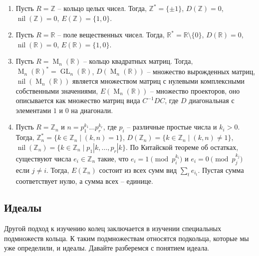 \begin{examples}
\begin{enumerate}
\item Пусть $R = \mathbb Z$ -- кольцо целых чисел.
Тогда, $\mathbb Z^* = \{\pm 1\}$, $D(\mathbb Z) = 0$, $\operatorname{nil}(\mathbb Z) =  0$, $E(\mathbb Z) = \{1, 0\}$.

\item Пусть $R = \mathbb R$ -- поле вещественных чисел.
Тогда, $\mathbb R^* = \mathbb R\setminus\{0\}$, $D(\mathbb R) = 0$, $\operatorname{nil}(\mathbb R) = 0$, $E(\mathbb R) = \{1, 0\}$.

\item Пусть $R = \operatorname{M}_n(\mathbb R)$ -- кольцо квадратных матриц.
Тогда, $\operatorname{M}_n(\mathbb R)^* = \operatorname{GL}_n(\mathbb R)$, $D(\operatorname{M}_n(\mathbb R))$ -- множество вырожденных матриц, $\operatorname{nil}(\operatorname{M}_n(\mathbb R))$ является множеством матриц с нулевыми комплексными собственными значениями, $E(\operatorname{M}_n(\mathbb R))$ -- множество проекторов, оно описывается как множество матриц вида $C^{-1}DC$, где $D$ диагональная с элементами $1$ и $0$ на диагонали.

\item Пусть $R = \mathbb Z_n$ и $n = p_1^{k_1}\ldots p_r^{k_r}$, где $p_i$ -- различные простые числа и $k_i > 0$.
Тогда, $\mathbb Z_n^* = \{k\in \mathbb Z_n\mid (k, n) = 1\}$, $D(\mathbb Z_n) = \{k\in \mathbb Z_n\mid (k, n) \neq 1\}$, $\operatorname{nil}(\mathbb Z_n) = \{k\in \mathbb Z_n\mid p_1|k,\ldots,p_r|k\}$.
По Китайской теореме об остатках, существуют числа $e_i\in \mathbb Z_n$ такие, что $e_i = 1 \pmod{p_i^{k_i}}$ и $e_i = 0\pmod{p_j^{k_j}}$ если $j\neq i$.
Тогда, $E(\mathbb Z_n)$ состоит из всех сумм вид $\sum_{t} e_{i_t}$.
Пустая сумма соответствует нулю, а сумма всех -- единице.
\end{enumerate}
\end{examples}

\subsection{Идеалы}

Другой подход к изучению колец заключается в изучении специальных подмножеств кольца.
К таким подмножествам относятся подкольца, которые мы уже определили, и идеалы.
Давайте разберемся с понятием идеала.

